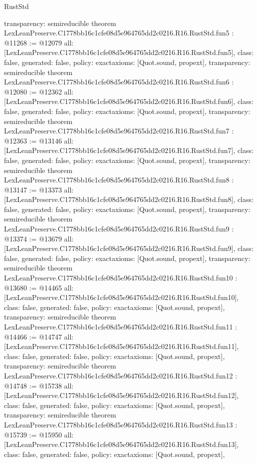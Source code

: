 \begin{lexlean}{RustStd}
\begin{coremodule}
{  transparency: semireducible
}
theorem LexLeanPreserve.C1778bb16c1cfe08d5e964765dd2c0216.R16.RustStd.fun5 : @11268 := @12079 {
  all: [LexLeanPreserve.C1778bb16c1cfe08d5e964765dd2c0216.R16.RustStd.fun5],
  class: false,
  generated: false,
  policy: exact{axioms: [Quot.sound, propext]},
  transparency: semireducible
}
theorem LexLeanPreserve.C1778bb16c1cfe08d5e964765dd2c0216.R16.RustStd.fun6 : @12080 := @12362 {
  all: [LexLeanPreserve.C1778bb16c1cfe08d5e964765dd2c0216.R16.RustStd.fun6],
  class: false,
  generated: false,
  policy: exact{axioms: [Quot.sound, propext]},
  transparency: semireducible
}
theorem LexLeanPreserve.C1778bb16c1cfe08d5e964765dd2c0216.R16.RustStd.fun7 : @12363 := @13146 {
  all: [LexLeanPreserve.C1778bb16c1cfe08d5e964765dd2c0216.R16.RustStd.fun7],
  class: false,
  generated: false,
  policy: exact{axioms: [Quot.sound, propext]},
  transparency: semireducible
}
theorem LexLeanPreserve.C1778bb16c1cfe08d5e964765dd2c0216.R16.RustStd.fun8 : @13147 := @13373 {
  all: [LexLeanPreserve.C1778bb16c1cfe08d5e964765dd2c0216.R16.RustStd.fun8],
  class: false,
  generated: false,
  policy: exact{axioms: [Quot.sound, propext]},
  transparency: semireducible
}
theorem LexLeanPreserve.C1778bb16c1cfe08d5e964765dd2c0216.R16.RustStd.fun9 : @13374 := @13679 {
  all: [LexLeanPreserve.C1778bb16c1cfe08d5e964765dd2c0216.R16.RustStd.fun9],
  class: false,
  generated: false,
  policy: exact{axioms: [Quot.sound, propext]},
  transparency: semireducible
}
theorem LexLeanPreserve.C1778bb16c1cfe08d5e964765dd2c0216.R16.RustStd.fun10 : @13680 := @14465 {
  all: [LexLeanPreserve.C1778bb16c1cfe08d5e964765dd2c0216.R16.RustStd.fun10],
  class: false,
  generated: false,
  policy: exact{axioms: [Quot.sound, propext]},
  transparency: semireducible
}
theorem LexLeanPreserve.C1778bb16c1cfe08d5e964765dd2c0216.R16.RustStd.fun11 : @14466 := @14747 {
  all: [LexLeanPreserve.C1778bb16c1cfe08d5e964765dd2c0216.R16.RustStd.fun11],
  class: false,
  generated: false,
  policy: exact{axioms: [Quot.sound, propext]},
  transparency: semireducible
}
theorem LexLeanPreserve.C1778bb16c1cfe08d5e964765dd2c0216.R16.RustStd.fun12 : @14748 := @15738 {
  all: [LexLeanPreserve.C1778bb16c1cfe08d5e964765dd2c0216.R16.RustStd.fun12],
  class: false,
  generated: false,
  policy: exact{axioms: [Quot.sound, propext]},
  transparency: semireducible
}
theorem LexLeanPreserve.C1778bb16c1cfe08d5e964765dd2c0216.R16.RustStd.fun13 : @15739 := @15950 {
  all: [LexLeanPreserve.C1778bb16c1cfe08d5e964765dd2c0216.R16.RustStd.fun13],
  class: false,
  generated: false,
  policy: exact{axioms: [Quot.sound, propext]},
}
\end{coremodule}
\end{lexlean}
